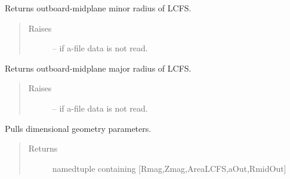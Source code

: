 \documentclass[letterpaper,10pt,english]{sphinxmanual}
\begin{document}
\begin{fulllineitems}
\begin{fulllineitems}
\begin{quote}
\begin{description}
\end{description}\end{quote}

\end{fulllineitems}


\begin{fulllineitems}
\label{eqtools:eqtools.eqdskreader.EqdskReader.getAOut}
Returns outboard-midplane minor radius of LCFS.
\begin{quote}\begin{description}
\item[{Raises}] \leavevmode
{} -- if a-file data is not read.

\end{description}\end{quote}

\end{fulllineitems}


\begin{fulllineitems}
\label{eqtools:eqtools.eqdskreader.EqdskReader.getRmidOut}
Returns outboard-midplane major radius of LCFS.
\begin{quote}\begin{description}
\item[{Raises}] \leavevmode
{} -- if a-file data is not read.

\end{description}\end{quote}

\end{fulllineitems}


\begin{fulllineitems}
\label{eqtools:eqtools.eqdskreader.EqdskReader.getGeometry}
Pulls dimensional geometry parameters.
\begin{quote}\begin{description}
\item[{Returns}] \leavevmode
namedtuple containing {[}Rmag,Zmag,AreaLCFS,aOut,RmidOut{]}


\end{description}
\end{quote}
\end{fulllineitems}
\end{fulllineitems}
\end{document}
